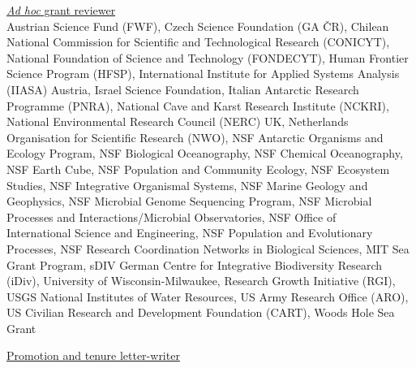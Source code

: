 \documentclass[11pt]{article}
\begin{document}
\vspace{-0.5em}
\textnormal{\underline{\textit{Ad hoc} grant reviewer}}\\[0.25em]
Austrian Science Fund (FWF), Czech Science Foundation (GA ČR), Chilean National Commission for Scientific and Technological Research (CONICYT), National Foundation of Science and Technology (FONDECYT), Human Frontier Science Program (HFSP), International Institute for Applied Systems Analysis (IIASA) Austria, Israel Science Foundation, Italian Antarctic Research Programme (PNRA), National Cave and Karst Research Institute (NCKRI), National Environmental Research Council (NERC) UK, Netherlands Organisation for Scientific Research (NWO), NSF Antarctic Organisms and Ecology Program, NSF Biological Oceanography, NSF Chemical Oceanography, NSF Earth Cube, NSF Population and Community Ecology, NSF Ecosystem Studies, NSF Integrative Organismal Systems, NSF Marine Geology and Geophysics, NSF Microbial Genome Sequencing Program, NSF Microbial Processes and Interactions/Microbial Observatories, NSF Office of \\ International Science and Engineering, NSF Population and Evolutionary Processes, NSF Research Coordination Networks in Biological Sciences, MIT Sea Grant Program, sDIV German Centre for Integrative Biodiversity Research (iDiv), University of Wisconsin-Milwaukee, Research Growth Initiative (RGI), USGS National Institutes of Water Resources, US Army Research Office (ARO), US Civilian Research and Development Foundation (CART), Woods Hole Sea Grant

\vspace{1.5em}
\textnormal{\underline{Promotion and tenure letter-writer}}\\[-2.5em]
\end{document}
